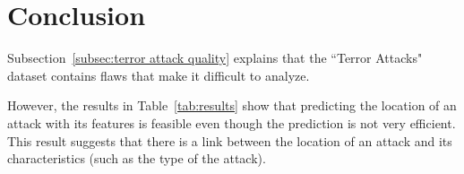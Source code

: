 \section{Conclusion}
\label{sec:Conclusion}
Subsection~\ref{subsec:terror attack quality} explains that the ``Terror Attacks" dataset contains flaws that make it difficult to analyze.

However, the results in Table~\ref{tab:results} show that predicting the location of an attack with its features is feasible even though the prediction is not very efficient. This result suggests that there is a link between the location of an attack and its characteristics (such as the type of the attack).